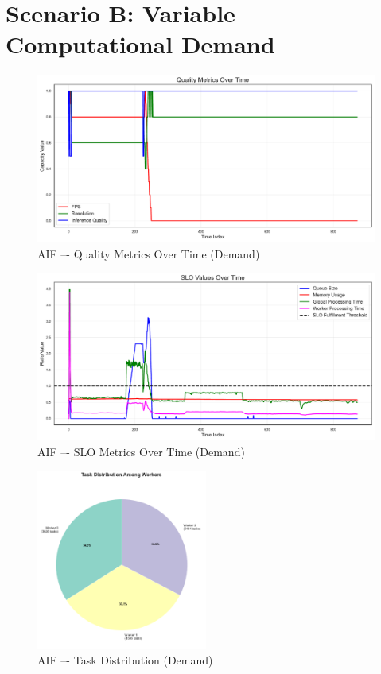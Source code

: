 \clearpage
\section{Scenario B: Variable Computational Demand}





\begin{figure}[h]
    \centering
    \includegraphics[width=\textwidth]{img/results/variable_computational_demand/active_inference_relative_control_quality_metrics.pdf}
    \caption{AIF –- Quality Metrics Over Time (Demand)}
\end{figure}
\begin{figure}[h]
    \centering
    \includegraphics[width=\textwidth]{img/results/variable_computational_demand/active_inference_relative_control_slo_values.pdf}
    \caption{AIF –- SLO Metrics Over Time (Demand)}
\end{figure}
\begin{figure}[h]
    \centering
    \includegraphics[width=0.5\textwidth]{img/results/variable_computational_demand/active_inference_relative_control_task_distribution_pie.pdf}
    \caption{AIF –- Task Distribution (Demand)}
\end{figure}
